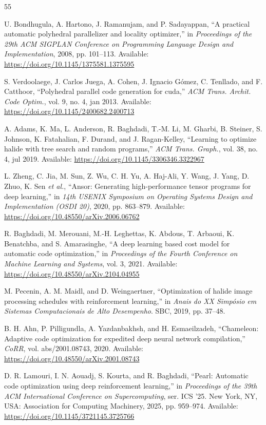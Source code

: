 \documentclass[10pt,twocolumn]{article}
\begin{document}
\begin{thebibliography}{55}

 U. Bondhugula, A. Hartono, J. Ramanujam, and P. Sadayappan, ``A practical automatic polyhedral parallelizer and locality optimizer,'' in \emph{Proceedings of the 29th ACM SIGPLAN Conference on Programming Language Design and Implementation}, 2008, pp. 101--113. Available: \url{https://doi.org/10.1145/1375581.1375595}

 S. Verdoolaege, J. Carlos Juega, A. Cohen, J. Ignacio G\'omez, C. Tenllado, and F. Catthoor, ``Polyhedral parallel code generation for cuda,'' \emph{ACM Trans. Archit. Code Optim.}, vol. 9, no. 4, jan 2013. Available: \url{https://doi.org/10.1145/2400682.2400713}

 A. Adams, K. Ma, L. Anderson, R. Baghdadi, T.-M. Li, M. Gharbi, B. Steiner, S. Johnson, K. Fatahalian, F. Durand, and J. Ragan-Kelley, ``Learning to optimize halide with tree search and random programs,'' \emph{ACM Trans. Graph.}, vol. 38, no. 4, jul 2019. Available: \url{https://doi.org/10.1145/3306346.3322967}

 L. Zheng, C. Jia, M. Sun, Z. Wu, C. H. Yu, A. Haj-Ali, Y. Wang, J. Yang, D. Zhuo, K. Sen \emph{et al.}, ``Ansor: Generating high-performance tensor programs for deep learning,'' in \emph{14th USENIX Symposium on Operating Systems Design and Implementation (OSDI 20)}, 2020, pp. 863--879. Available: \url{https://doi.org/10.48550/arXiv.2006.06762}

 R. Baghdadi, M. Merouani, M.-H. Leghettas, K. Abdous, T. Arbaoui, K. Benatchba, and S. Amarasinghe, ``A deep learning based cost model for automatic code optimization,'' in \emph{Proceedings of the Fourth Conference on Machine Learning and Systems}, vol. 3, 2021. Available: \url{https://doi.org/10.48550/arXiv.2104.04955}

 M. Pecenin, A. M. Maidl, and D. Weingaertner, ``Optimization of halide image processing schedules with reinforcement learning,'' in \emph{Anais do XX Simp\'osio em Sistemas Computacionais de Alto Desempenho}. SBC, 2019, pp. 37--48.

 B. H. Ahn, P. Pilligundla, A. Yazdanbakhsh, and H. Esmaeilzadeh, ``Chameleon: Adaptive code optimization for expedited deep neural network compilation,'' \emph{CoRR}, vol. abs/2001.08743, 2020. Available: \url{https://doi.org/10.48550/arXiv.2001.08743}

 D. R. Lamouri, I. N. Aouadj, S. Kourta, and R. Baghdadi, ``Pearl: Automatic code optimization using deep reinforcement learning,'' in \emph{Proceedings of the 39th ACM International Conference on Supercomputing}, ser. ICS '25. New York, NY, USA: Association for Computing Machinery, 2025, pp. 959--974. Available: \url{https://doi.org/10.1145/3721145.3725766}


\end{thebibliography}
\end{document}
